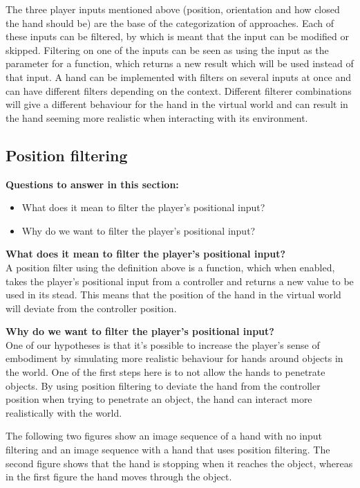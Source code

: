 The three player inputs mentioned above (position, orientation and how closed the hand should be) are the base of the categorization of approaches. Each of these inputs can be filtered, by which is meant that the input can be modified or skipped. Filtering on one of the inputs can be seen as using the input as the parameter for a function, which returns a new result which will be used instead of that input. A hand can be implemented with filters on several inputs at once and can have different filters depending on the context. Different filterer combinations will give a different behaviour for the hand in the virtual world and can result in the hand seeming more realistic when interacting with its environment.


\subsection{Position filtering}
\label{subsec:categoryPositionFiltering}
\textbf{Questions to answer in this section:}
\begin{itemize}
\item What does it mean to filter the player's positional input?
\item Why do we want to filter the player's positional input?
\end{itemize}

\textbf{What does it mean to filter the player's positional input?}\\
A position filter using the definition above is a function, which when enabled, takes the player's positional input from a controller and returns a new value to be used in its stead. This means that the position of the hand in the virtual world will deviate from the controller position.

\textbf{Why do we want to filter the player's positional input?}\\
One of our hypotheses is that it's possible to increase the player's sense of embodiment by simulating more realistic behaviour for hands around objects in the world. One of the first steps here is to not allow the hands to penetrate objects. By using position filtering to deviate the hand from the controller position when trying to penetrate an object, the hand can interact more realistically with the world.

The following two figures show an image sequence of a hand with no input filtering and an image sequence with a hand that uses position filtering. The second figure shows that the hand is stopping when it reaches the object, whereas in the first figure the hand moves through the object.

